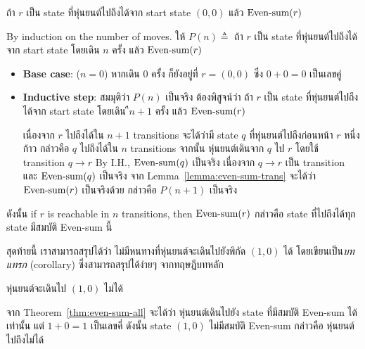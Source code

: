 \begin{theorem}\label{thm:even-sum-all}
ถ้า $r$ เป็น state ที่หุ่นยนต์ไปถึงได้จาก start state $(0,0)$ แล้ว $\textup{Even-sum}(r)$
\begin{pf}
By induction on the number of moves.  ให้ $P(n)\triangleq$ ถ้า $r$ เป็น state ที่หุ่นยนต์ไปถึงได้จาก start state โดยเดิน $n$ ครั้ง แล้ว $\textup{Even-sum}(r)$
\begin{itemize}
\item {\bf Base case}: ($n=0$) \quad หากเดิน 0 ครั้ง ก็ยังอยู่ที่ $r=(0,0)$ ซึ่ง $0+0=0$ เป็นเลขคู่ \quad\yea
\item {\bf Inductive step}: สมมุติว่า $P(n)$ เป็นจริง ต้องพิสูจน์ว่า ถ้า $r$ เป็น state ที่หุ่นยนต์ไปถึงได้จาก start state โดยเดิน $ืn+1$ ครั้ง แล้ว $\textup{Even-sum}(r)$

เนื่องจาก $r$ ไปถึงได้ใน $n+1$ transitions จะได้ว่ามี state $q$ ที่หุ่นยนต์ไปถึงก่อนหน้า $r$ หนึ่งก้าว กล่าวคือ $q$ ไปถึงได้ใน $n$ transitions \enskip จากนั้น หุ่นยนต์เดินจาก $q$ ไป $r$ โดยใช้ transition $q\to r$ \enskip By I.H., $\textup{Even-sum}(q)$ เป็นจริง \enskip เนื่องจาก $q\to r$ เป็น transition และ $\textup{Even-sum}(q)$ เป็นจริง จาก Lemma~\ref{lemma:even-sum-trans} จะได้ว่า $\textup{Even-sum}(r)$ เป็นจริงด้วย กล่าวคือ $P(n+1)$ เป็นจริง \quad\yea
\end{itemize}
ดังนั้น if $r$ is reachable in $n$ transitions, then $\textup{Even-sum}(r)$ กล่าวคือ state ที่ไปถึงได้ทุก state มีสมบัติ Even-sum นี้
\end{pf}
\end{theorem}

สุดท้ายนี้ เราสามารถสรุปได้ว่า ไม่มีหนทางที่หุ่นยนต์จะเดินไปยังพิกัด $(1,0)$ ได้ โดยเขียนเป็น\emph{บทแทรก} (corollary) ซึ่งสามารถสรุปได้ง่ายๆ จากทฤษฎีบทหลัก

\begin{corollary}
หุ่นยนต์จะเดินไป $(1,0)$ ไม่ได้
\begin{pf}
จาก Theorem~\ref{thm:even-sum-all} จะได้ว่า หุ่นยนต์เดินไปยัง state ที่มีสมบัติ Even-sum ได้เท่านั้น แต่ $1+0=1$ เป็นเลขคี่ ดังนั้น state $(1,0)$ ไม่มีสมบัติ Even-sum กล่าวคือ หุ่นยนต์ไปถึงไม่ได้
\end{pf}
\end{corollary}
